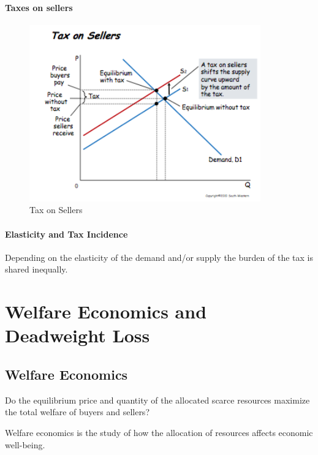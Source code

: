 \documentclass[a4paper,titlepage] {scrartcl}
\begin{document}
\paragraph{Taxes on sellers} %
\label{par:paragraph_name}

\begin{figure}[htbp]
	\centering
		\includegraphics[height=3in]{images/taxSellers.png}
	\caption{Tax on Sellers}
	\label{fig:images_taxSellers}
\end{figure}

\paragraph{Elasticity and Tax Incidence} %
\label{par:elasticity_and_tax_incidence}
Depending on the elasticity of the demand and/or supply the burden of the tax is shared inequally.

\section{Welfare Economics and Deadweight Loss}

\subsection{Welfare Economics}
Do the equilibrium price and quantity of the allocated 
scarce resources maximize the total welfare of buyers 
and sellers?

Welfare economics is the study of how the allocation 
of resources affects economic well-being.
\end{document}
